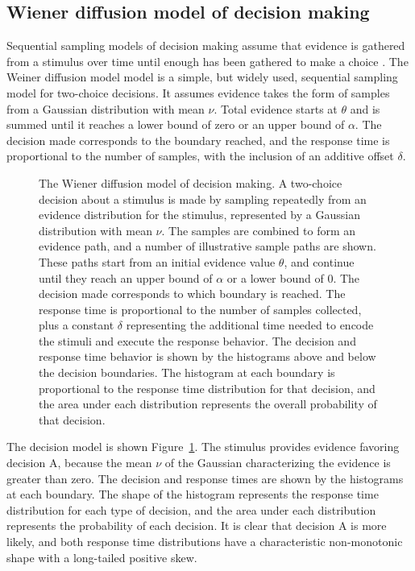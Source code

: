 \subsection{Wiener diffusion model of decision making}

Sequential sampling models of decision making assume that evidence is gathered from a stimulus over time until enough has been gathered to make a choice \cite{Luce1986}. The Weiner diffusion model \cite{RatcliffMcKoon2008} model is a simple, but widely used, sequential sampling model for two-choice decisions. It assumes evidence takes the form of samples from a Gaussian distribution with mean $\nu$. Total evidence starts at $\theta$ and is summed until it reaches a lower bound of zero or an upper bound of $\alpha$. The decision made corresponds to the boundary reached, and the response time is proportional to the number of samples, with the inclusion of an additive offset $\delta$.

\begin{figure}[tp]
\begin{center}
\caption{The Wiener diffusion model of decision making. A two-choice decision about a stimulus is made by sampling repeatedly from an evidence distribution for the stimulus, represented by a Gaussian distribution with mean $\nu$. The samples are combined to form an evidence path, and a number of illustrative sample paths are shown. These paths start from an initial evidence value $\theta$, and continue until they reach an upper bound of $\alpha$ or a lower bound of $0$. The decision made corresponds to which boundary is reached. The response time is proportional to the number of samples collected, plus a constant $\delta$ representing the additional time needed to encode the stimuli and execute the response behavior. The decision and response time behavior is shown by the histograms above and below the decision boundaries. The histogram at each boundary is proportional to the response time distribution for that decision, and the area under each distribution represents the overall probability of that decision.}
\label{DecisionMaking}
\end{center}
\end{figure}

The decision model is shown Figure~\ref{DecisionMaking}. The stimulus provides evidence favoring decision A, because the mean $\nu$ of the Gaussian characterizing the evidence is greater than zero. The decision and response times are shown by the histograms at each boundary. The shape of the histogram represents the response time distribution for each type of decision, and the area under each distribution represents the probability of each decision. It is clear that decision A is more likely, and both response time distributions have a characteristic non-monotonic shape with a long-tailed positive skew.

